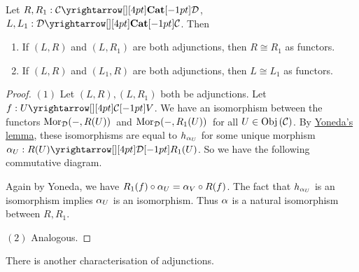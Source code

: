 \begin{prop}
  \hypertarget{adj_unique}{}

  Let $R, R_1 : \map{\CC}{\DD}{\CAT}{}$, $L, L_1: \map{\DD}{\CC}{\CAT}{}$.
  Then \begin{enumerate}
    \item If $(L,R)$ and $(L,R_1)$ are both adjunctions, 
    then $R \cong R_1$ as functors. 
    \item If $(L,R)$ and $(L_1, R)$ are both adjunctions, 
    then $L \cong L_1$ as functors. 
  \end{enumerate}
\end{prop}
\begin{proof}
  $(1)$ Let $(L,R), (L,R_1)$ both be adjunctions. 
  Let $f : \map{U}{V}{\CC}{}$. 
  We have an isomorphism between the functors 
  $\mathrm{Mor}_{\mathcal{D}}(-, R(U))\,$ and $\mathrm{Mor}_{\mathcal{D}}(-, R_1(U))\,$
  for all $U \in \mathrm{Obj}\left(\mathcal{C}\right)$. 
  By \hyperlink{yoneda}{Yoneda's lemma}, 
  these isomorphisms are equal to $h_{\alpha_U}$ 
  for some unique morphism $\al_U : \map{R(U)}{R_1(U)}{\DD}{}$.
  So we have the following commutative diagram. 
  \begin{figure}[H]
    \centering
  \end{figure}
  Again by Yoneda, 
  we have $R_1(f) \circ \alpha_U = \alpha_V \circ R(f)$.
  The fact that $h_{\alpha_U}$ is an isomorphism implies 
  $\alpha_U$ is an isomorphism. 
  Thus $\alpha$ is a natural isomorphism between $R, R_1$.

  $(2)$ Analogous. 
\end{proof}

\begin{rmk}
  There is another characterisation of adjunctions.
\end{rmk}

